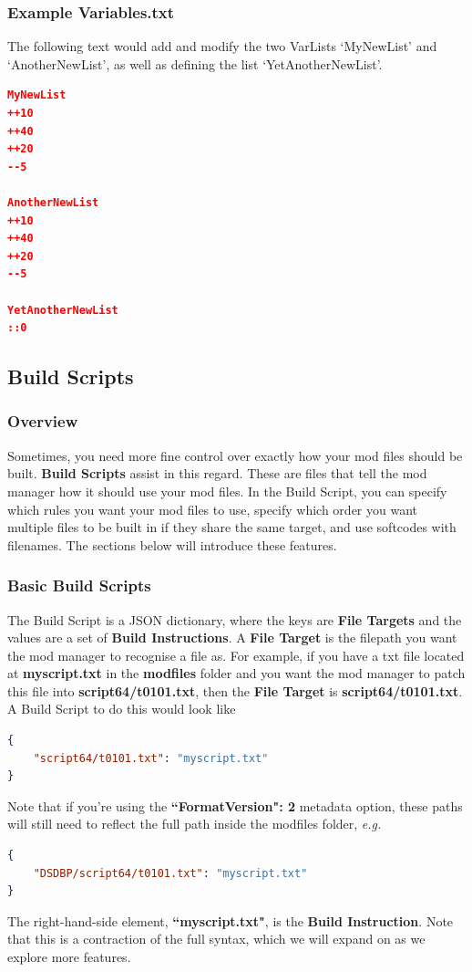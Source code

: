 \documentclass{article}
\begin{document}
\subsubsection{Example Variables.txt}
The following text would add and modify the two VarLists `MyNewList' and `AnotherNewList', as well as defining the list `YetAnotherNewList'.
\begin{lstlisting}[language=json,firstnumber=1]
MyNewList
++10
++40
++20
--5

AnotherNewList
++10
++40
++20
--5

YetAnotherNewList
::0
\end{lstlisting}
\newpage
\subsection{Build Scripts}\label{Section:BuildScripts}
\subsubsection{Overview}
Sometimes, you need more fine control over exactly how your mod files should be built. \textbf{Build Scripts} assist in this regard. These are files that tell the mod manager how it should use your mod files. In the Build Script, you can specify which rules you want your mod files to use, specify which order you want multiple files to be built in if they share the same target, and use softcodes with filenames. The sections below will introduce these features.

\subsubsection{Basic Build Scripts}
The Build Script is a JSON dictionary, where the keys are \textbf{File Targets} and the values are a set of \textbf{Build Instructions}. 
A \textbf{File Target} is the filepath you want the mod manager to recognise a file as. For example, if you have a txt file located at \textbf{myscript.txt} in the \textbf{modfiles} folder and you want the mod manager to patch this file into \textbf{script64/t0101.txt}, then the \textbf{File Target} is \textbf{script64/t0101.txt}. A Build Script to do this would look like
\begin{lstlisting}[language=json,firstnumber=1]
{
    "script64/t0101.txt": "myscript.txt"
}
\end{lstlisting}
Note that if you're using the \textbf{``FormatVersion": 2} metadata option, these paths will still need to reflect the full path inside the modfiles folder, \textit{e.g.}
\begin{lstlisting}[language=json,firstnumber=1]
{
    "DSDBP/script64/t0101.txt": "myscript.txt"
}
\end{lstlisting}
\noindent
The right-hand-side element, \textbf{``myscript.txt"}, is the \textbf{Build Instruction}. Note that this is a contraction of the full syntax, which we will expand on as we explore more features.
\end{document}
